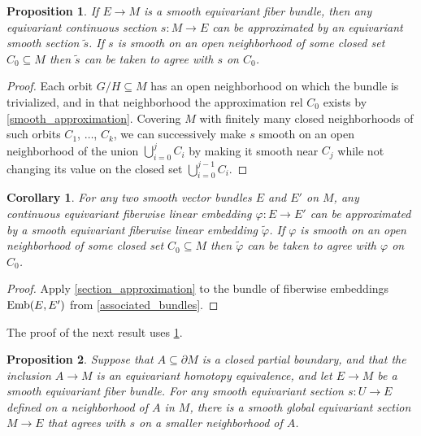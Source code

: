 \documentclass[11pt]{amsart}
\newtheorem{cor}{Corollary}[section]
\newtheorem{prop}{Proposition}[section]
\theoremstyle{definition}
\numberwithin{equation}{section}
\numberwithin{figure}{section}
\newcommand{\Emb}{\textup{Emb}}
\begin{document}
\begin{prop}\label{section_approximation}
	If $E \to M$ is a smooth equivariant fiber bundle, then any equivariant continuous section $s\colon M \to E$ can be approximated by an equivariant smooth section $\tilde s$. If $s$ is smooth on an open neighborhood of some closed set $C_0 \subseteq M$ then $\tilde s$ can be taken to agree with $s$ on $C_0$.
\end{prop}

\begin{proof}
	Each orbit $G/H \subseteq M$ has an open neighborhood on which the bundle is trivialized, and in that neighborhood the approximation rel $C_0$ exists by \autoref{smooth_approximation}. Covering $M$ with finitely many closed neighborhoods of such orbits $C_1$, $\ldots$, $C_k$, we can successively make $s$ smooth on an open neighborhood of the union $\bigcup_{i = 0}^j C_i$ by making it smooth near $C_j$ while not changing its value on the closed set $\bigcup_{i = 0}^{j-1} C_i$.
\end{proof}

\begin{cor}\label{embedding_approximation}
	For any two smooth vector bundles $E$ and $E'$ on $M$, any continuous equivariant fiberwise linear embedding $\varphi\colon E \to E'$ can be approximated by a smooth equivariant fiberwise linear embedding $\tilde\varphi$. If $\varphi$ is smooth on an open neighborhood of some closed set $C_0 \subseteq M$ then $\tilde\varphi$ can be taken to agree with $\varphi$ on $C_0$.
\end{cor}

\begin{proof}
	Apply \autoref{section_approximation} to the bundle of fiberwise embeddings $\Emb(E,E')$ from \autoref{associated_bundles}.
\end{proof}

The proof of the next result uses \ref{section_approximation}.

\begin{prop}\label{section_extension}
	Suppose that $A \subseteq \partial M$ is a closed partial boundary, and that the inclusion $A \to M$ is an equivariant homotopy equivalence, and let $E \to M$ be a smooth equivariant fiber bundle. For any smooth equivariant section $s\colon U \to E$ defined on a neighborhood of $A$ in $M$, there is a smooth global equivariant section $M\to E$ that agrees with $s$ on a smaller neighborhood of $A$.
\end{prop}
\end{document}
